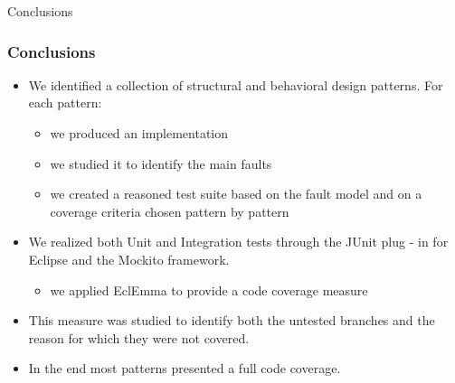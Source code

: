 \documentclass{beamer}
\begin{document}
		
		\begin{section}{}
			\begin{subsection}{Conclusions}
				\begin{frame}
					
					\frametitle{Conclusions}
						\begin{itemize}
						\item We identified a collection of structural and behavioral design patterns. For each pattern:
							{\footnotesize \begin{itemize}
								\item we produced an implementation
							\end{itemize} 
							\begin{itemize}
								\item we studied it to identify the main faults
							\end{itemize} 
								\begin{itemize}
									\item we created a reasoned test suite based on the fault model and on a coverage criteria chosen pattern by pattern
								\end{itemize} }
						
						\item We realized both Unit and Integration tests through the JUnit plug - in for Eclipse and the Mockito framework.
								{\footnotesize \begin{itemize}
									\item we applied EclEmma to provide a code coverage measure
								\end{itemize}} 
								
						\item This measure was studied to identify both the untested branches and the reason for which they were not covered.
						
						\item In the end most patterns presented a full code coverage.
					\end{itemize}
					
				\end{frame}
			\end{subsection}
		\end{section}
\end{document}
